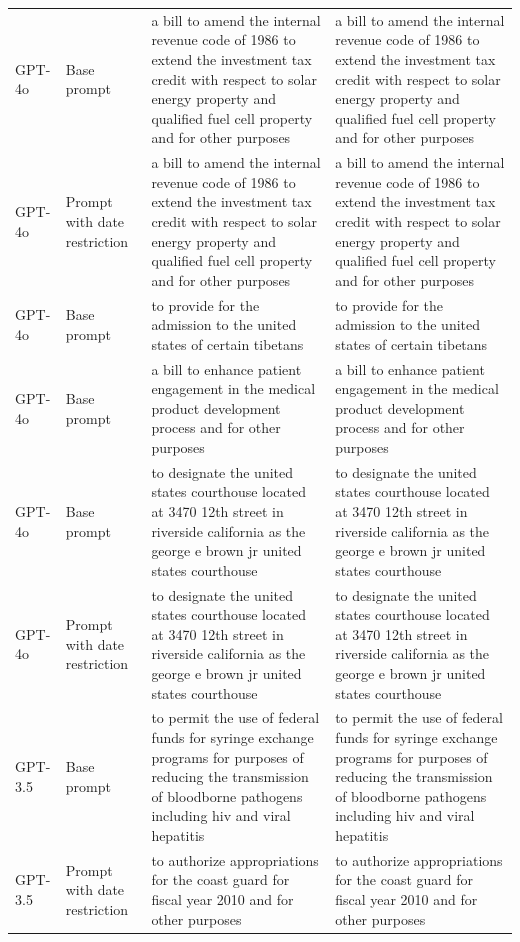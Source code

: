 \begin{longtable}{>{\raggedright\arraybackslash}p{1.4cm}>{\raggedright\arraybackslash}p{1.4cm}>{\raggedright\arraybackslash}p{5.5cm}>{\raggedright\arraybackslash}p{5.5cm}}
GPT-4o & Base prompt & a bill to amend the internal revenue code of 1986 to extend the investment tax credit with respect to solar energy property and qualified fuel cell property and for other purposes & a bill to amend the internal revenue code of 1986 to extend the investment tax credit with respect to solar energy property and qualified fuel cell property and for other purposes\\
GPT-4o & Prompt with date restriction & a bill to amend the internal revenue code of 1986 to extend the investment tax credit with respect to solar energy property and qualified fuel cell property and for other purposes & a bill to amend the internal revenue code of 1986 to extend the investment tax credit with respect to solar energy property and qualified fuel cell property and for other purposes\\
GPT-4o & Base prompt & to provide for the admission to the united states of certain tibetans & to provide for the admission to the united states of certain tibetans\\
GPT-4o & Base prompt & a bill to enhance patient engagement in the medical product development process and for other purposes & a bill to enhance patient engagement in the medical product development process and for other purposes\\
GPT-4o & Base prompt & to designate the united states courthouse located at 3470 12th street in riverside california as the george e brown jr united states courthouse & to designate the united states courthouse located at 3470 12th street in riverside california as the george e brown jr united states courthouse\\
GPT-4o & Prompt with date restriction & to designate the united states courthouse located at 3470 12th street in riverside california as the george e brown jr united states courthouse & to designate the united states courthouse located at 3470 12th street in riverside california as the george e brown jr united states courthouse\\
GPT-3.5 & Base prompt & to permit the use of federal funds for syringe exchange programs for purposes of reducing the transmission of bloodborne pathogens including hiv and viral hepatitis & to permit the use of federal funds for syringe exchange programs for purposes of reducing the transmission of bloodborne pathogens including hiv and viral hepatitis\\
GPT-3.5 & Prompt with date restriction & to authorize appropriations for the coast guard for fiscal year 2010 and for other purposes & to authorize appropriations for the coast guard for fiscal year 2010 and for other purposes\\

\end{longtable}
